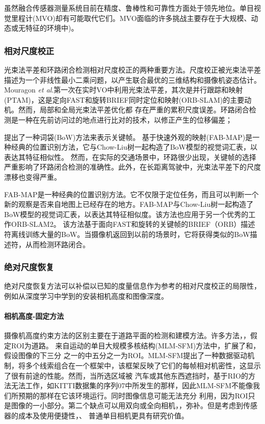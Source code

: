 虽然融合传感器测量系统目前在精度、鲁棒性和可靠性方面处于领先地位\cite{ye2019tightly}\cite{zhang2014loam}。单目视觉里程计(MVO)却有可能取代它们。MVO面临的许多挑战\cite{scaramuzza2011visual}主要存在于大规模、动态或无特征的环境中)。




\subsubsection{相对尺度校正}
光束法平差\cite{triggs1999bundle}和环路闭合检测相对尺度校正的两种重要方法。尺度校正被光束法平差描述为一个非线性最小二乘问题，以产生联合最优的三维结构和摄像机姿态估计。Mouragon \textit{et al}.\cite{mouragnon2006real}第一次在实时VO中利用光束法平差，其次是并行跟踪和映射(PTAM)，这是定向FAST和旋转BRIEF同时定位和映射(ORB-SLAM)的主要动机。然而，局部和全局光束法平差优化都
存在严重的累积尺度误差。环路闭合检测是一种在先前访问过的地点进行比对的技术，以修正产生的位移偏差；

\cite{nister2006scalable}提出了一种词袋(BoW)方法来表示关键帧。 基于快速外观的映射(FAB-MAP)\cite{cummins2008fab}是一种经典的位置识别方法，它与Chow-Liu树\cite{chow1968approximating}一起构造了BoW模型的视觉词汇表，以表达其特征相似性。 然而，在实际的交通场景中，环路很少出现，关键帧的选择严重影响了环路闭合检测的准确性\cite{piao2019real}。此外，在长距离驾驶中，光束法平差下的尺度漂移也变得严重\cite{mouragnon2006real}\cite{klein2007parallel}。

FAB-MAP\cite{cummins2008fab}是一种经典的位置识别方法。它不仅限于定位任务，而且可以判断一个新的观察是否来自地图上已经存在的地方。FAB-MAP与Chow-Liu树\cite{chow1968approximating}一起构造了BoW模型的视觉词汇表，以表达其特征相似度。该方法也应用于另一个优秀的工作ORB-SLAM2\cite{Mur2016ORB}。 该方法基于面向FAST和旋转的关键帧的BRIEF（ORB）描述符离线训练大量的BoW。当摄像机返回到以前的场景时，它将获得类似的BoW描述符，从而检测环路闭合。

\subsubsection{绝对尺度恢复}
绝对尺度恢复方法可以补偿以已知的度量信息作为参考的相对尺度校正的局限性，例如从深度学习中学到的安装相机高度和图像深度。
\paragraph{相机高度-固定方法}
摄像机高度约束方法的区别主要在于道路平面的检测和建模方法。许多方法\cite{kitt2011mono}，\cite{Song2015MoncularScale}，\cite{zhou2016reliable}假定ROI为道路。 
来自运动的单目大规模多核结构(MLM-SFM)方法\cite{Song2015MoncularScale}中，扩展了\cite{song2014robust}和\cite{Song2013Parallel}，假设图像的下三分
之一的中五分之一为ROI。MLM-SFM提出了一种数据驱动机制，将多个线索组合在一个框架中，该框架反映了它们的每帧相对机密性，这显示了很有前途的性能。然而，当所选区域被
汽车或其他东西遮挡时，基于RIO的方法无法工作，如KITTI数据集的序列07中所发生的那样，因此MLM-SFM不能像我们所预期的那样在它该环境运行。同时图像信息可能无法充分
利用，因为ROI只是图像的一小部分。第二个缺点可以用双向或全向相机\cite{gutierrez2012full}，\cite{scaramuzza2008appearance}，\cite{scaramuzza2006flexible}弥补。但是考虑到传感器的成本及使用便捷性，、
普通单目相机更具有研究价值。

